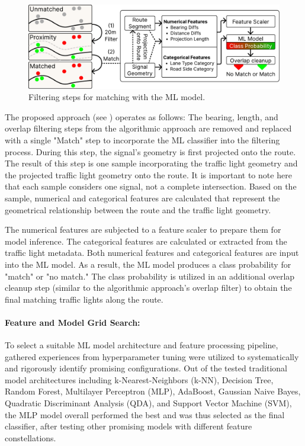 \begin{figure}[htbp]
\centering
\includegraphics[width=\linewidth]{images/sg-matching-ml-model.pdf}
\caption{Filtering steps for matching with the ML model.}
\label{fig:sg-matching-ml-model}
\end{figure}

The proposed approach (see ) operates as follows: The bearing, length, and overlap filtering steps from the algorithmic approach are removed and replaced with a single "Match" step to incorporate the ML classifier into the filtering process. During this step, the signal's geometry is first projected onto the route. The result of this step is one sample incorporating the traffic light geometry and the projected traffic light geometry onto the route. It is important to note here that each sample considers one signal, not a complete intersection. Based on the sample, numerical and categorical features are calculated that represent the geometrical relationship between the route and the traffic light geometry.

The numerical features are subjected to a feature scaler to prepare them for model inference. The categorical features are calculated or extracted from the traffic light metadata. Both numerical features and categorical features are input into the ML model. As a result, the ML model produces a class probability for "match" or "no match." The class probability is utilized in an additional overlap cleanup step (similar to the algorithmic approach's overlap filter) to obtain the final matching traffic lights along the route.

\paragraph{Feature and Model Grid Search:} To select a suitable ML model architecture and feature processing pipeline, gathered experiences from hyperparameter tuning were utilized to systematically and rigorously identify promising configurations. Out of the tested traditional model architectures including k-Nearest-Neighbors (k-NN), Decision Tree, Random Forest, Multilayer Perceptron (MLP), AdaBoost, Gaussian Naive Bayes, Quadratic Discriminant Analysis (QDA), and Support Vector Machine (SVM), the MLP model overall performed the best and was thus selected as the final classifier, after testing other promising models with different feature constellations. 

